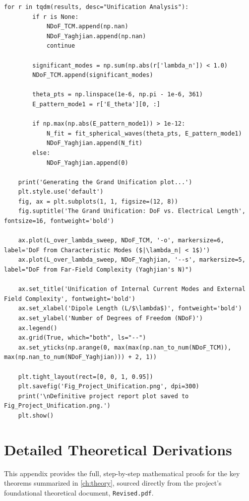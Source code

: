 \documentclass[11pt, a4paper]{report}
\begin{document}
\begin{lstlisting}[caption={Driver script for the Unification Analysis.}, label={lst:run_unification}]
    for r in tqdm(results, desc="Unification Analysis"):
        if r is None:
            NDoF_TCM.append(np.nan)
            NDoF_Yaghjian.append(np.nan)
            continue

        significant_modes = np.sum(np.abs(r['lambda_n']) < 1.0)
        NDoF_TCM.append(significant_modes)
        
        theta_pts = np.linspace(1e-6, np.pi - 1e-6, 361)
        E_pattern_mode1 = r['E_theta'][0, :]
        
        if np.max(np.abs(E_pattern_mode1)) > 1e-12:
            N_fit = fit_spherical_waves(theta_pts, E_pattern_mode1)
            NDoF_Yaghjian.append(N_fit)
        else:
            NDoF_Yaghjian.append(0)

    print('Generating the Grand Unification plot...')
    plt.style.use('default')
    fig, ax = plt.subplots(1, 1, figsize=(12, 8))
    fig.suptitle('The Grand Unification: DoF vs. Electrical Length', fontsize=16, fontweight='bold')

    ax.plot(L_over_lambda_sweep, NDoF_TCM, '-o', markersize=6, label='DoF from Characteristic Modes ($|\lambda_n| < 1$)')
    ax.plot(L_over_lambda_sweep, NDoF_Yaghjian, '--s', markersize=5, label="DoF from Far-Field Complexity (Yaghjian's N)")
    
    ax.set_title('Unification of Internal Current Modes and External Field Complexity', fontweight='bold')
    ax.set_xlabel('Dipole Length (L/$\lambda$)', fontweight='bold')
    ax.set_ylabel('Number of Degrees of Freedom (NDoF)')
    ax.legend()
    ax.grid(True, which="both", ls="--")
    ax.set_yticks(np.arange(0, max(max(np.nan_to_num(NDoF_TCM)), max(np.nan_to_num(NDoF_Yaghjian))) + 2, 1))

    plt.tight_layout(rect=[0, 0, 1, 0.95])
    plt.savefig('Fig_Project_Unification.png', dpi=300)
    print('\nDefinitive project report plot saved to Fig_Project_Unification.png.')
    plt.show()
\end{lstlisting}

\newpage
\chapter{Detailed Theoretical Derivations} \label{app:proofs}
This appendix provides the full, step-by-step mathematical proofs for the key theorems summarized in \cref{ch:theory}, sourced directly from the project's foundational theoretical document, \texttt{Revised.pdf}.
\end{document}

